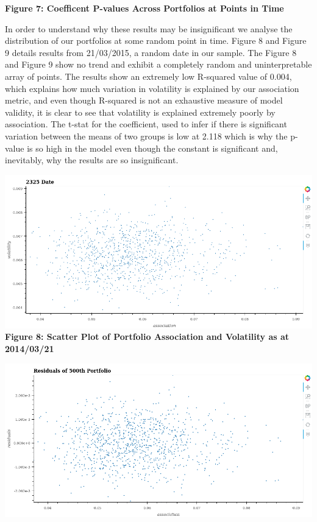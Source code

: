 \documentclass[11pt]{article}
\makeatletter
\def\maxwidth{\ifdim\Gin@nat@width>\linewidth\linewidth
    \else\Gin@nat@width\fi}
\let\Oldincludegraphics\includegraphics
\renewcommand{\includegraphics}[1]{\Oldincludegraphics[width=.8\maxwidth]{#1}}
\makeatother
\begin{document}
\textbf{Figure 7: Coefficent P-values Across Portfolios at Points in
Time}

In order to understand why these results may be insignificant we analyse
the distribution of our portfolios at some random point in time. Figure
8 and Figure 9 details results from 21/03/2015, a random date in our
sample. The Figure 8 and Figure 9 show no trend and exhibit a completely
random and uninterpretable array of points. The results show an
extremely low R-squared value of 0.004, which explains how much
variation in volatility is explained by our association metric, and even
though R-squared is not an exhaustive measure of model validity, it is
clear to see that volatility is explained extremely poorly by
association. The t-stat for the coefficient, used to infer if there is
significant variation between the means of two groups is low at 2.118
which is why the p-value is so high in the model even though the
constant is significant and, inevitably, why the results are so
insignificant.

\includegraphics{../experiments/media/Scatter Plot of Portfolios on 2014-03-21.png}\\

\textbf{Figure 8: Scatter Plot of Portfolio Association and Volatility
as at 2014/03/21}

\includegraphics{../experiments/media/Scatter Plot of Residuals of Portfolios on 2014-03-21.png}\\
\end{document}
